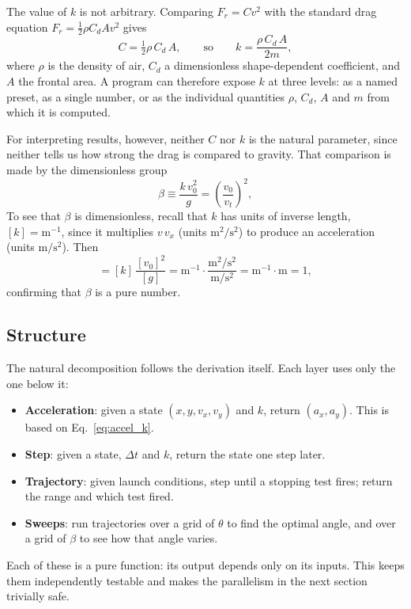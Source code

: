 \documentclass[11pt]{article}
\begin{document}
The value of $k$ is not arbitrary. Comparing $F_r = Cv^2$ with the
standard drag equation $F_r = \tfrac{1}{2}\rho C_d A v^2$ gives
\begin{equation}
    C = \tfrac{1}{2}\rho\,C_d\,A ,
    \qquad\text{so}\qquad
    k = \frac{\rho\,C_d\,A}{2m},
\end{equation}
where $\rho$ is the density of air, $C_d$ a dimensionless
shape-dependent coefficient, and $A$ the frontal area. A program can
therefore expose $k$ at three levels: as a named preset, as a single
number, or as the individual quantities $\rho$, $C_d$, $A$ and $m$
from which it is computed.

For interpreting results, however, neither $C$ nor $k$ is the natural
parameter, since neither tells us how strong the drag is compared to
gravity. That comparison is made by the dimensionless group
\begin{equation}
    \beta \equiv \frac{k\,v_0^2}{g} = \left(\frac{v_0}{v_t}\right)^2 ,
\end{equation}
To see that $\beta$ is dimensionless, recall that $k$ has units of
inverse length, $[k] = \mathrm{m}^{-1}$, since it multiplies $v\,v_x$
(units $\mathrm{m}^2/\mathrm{s}^2$) to produce an acceleration (units
$\mathrm{m}/\mathrm{s}^2$). Then
\begin{equation}
    [\beta] = [k]\,\frac{[v_0]^2}{[g]}
    = \mathrm{m}^{-1} \cdot
    \frac{\mathrm{m}^2/\mathrm{s}^2}{\mathrm{m}/\mathrm{s}^2}
    = \mathrm{m}^{-1}\cdot\mathrm{m} = 1,
\end{equation}
confirming that $\beta$ is a pure number.

\subsection{Structure}

The natural decomposition follows the derivation itself. Each layer
uses only the one below it:
\begin{itemize}
    \item \textbf{Acceleration}: given a state $(x, y, v_x, v_y)$
    and $k$, return $(a_x, a_y)$. This is based on Eq.~\eqref{eq:accel_k}.
    \item \textbf{Step}: given a state, $\Delta t$ and $k$, return
    the state one step later.
    \item \textbf{Trajectory}: given launch conditions, step until
    a stopping test fires; return the range and which test fired.
    \item \textbf{Sweeps}: run trajectories over a grid of
    $\theta$ to find the optimal angle, and over a grid of $\beta$ to
    see how that angle varies.
\end{itemize}
Each of these is a pure function: its output depends only on its
inputs. This keeps them independently testable
and makes the parallelism in the next section trivially safe.
\end{document}
